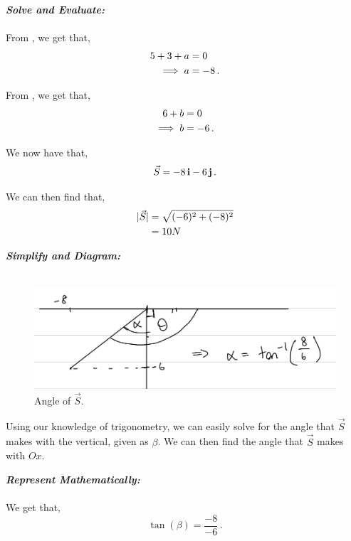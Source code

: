 \begin{subquestions}
\begin{subsubquestions}
\textbf{\textit{Solve and Evaluate:}} \\ \\
From , we get that,
\begin{align}
	5+3+a & = 0 \nonumber \\
	\implies a & = -8 \,.
\end{align}

From , we get that,
\begin{align}
	6+b & = 0 \nonumber \\
	\implies b & = -6 \,.
\end{align}

We now have that,
\begin{equation}
	\vec{S} = -8\,\mathbf{i} -6\,\mathbf{j} \,.
\end{equation}

We can then find that,
\begin{align}
	|\vec{S}| & = \sqrt{(-6)^2+(-8)^2} \nonumber \\
	          & = 10N
\end{align}


\subsubquestion

\textbf{\textit{Simplify and Diagram:}} \\ \\
\begin{figure}[H]
	\begin{center}
		\includegraphics[scale=0.25]{../2010/figures/2010q6-4}
		\caption{\label{2010:q6:Diagram4} Angle of $\vec{S}$.}
	\end{center}
\end{figure}
Using our knowledge of trigonometry, we can easily solve for the angle that $\vec{S}$ makes with the vertical, given as $\beta$. We can then find the angle that $\vec{S}$ makes with $Ox$.




\textbf{\textit{Represent Mathematically:}} \\ \\
We get that,
\begin{equation}
	\tan(\beta) = \frac{-8}{-6} \,.
\end{equation}





\end{subsubquestions}
\end{subquestions}
